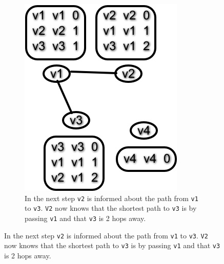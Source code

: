\begin{figure}
\begin{subfigure}{.45\textwidth}
        \includegraphics[width=\textwidth] {images/dv3.png}
        \caption{In the next step \texttt{v2} is informed about the path from \texttt{v1} to \texttt{v3}. \texttt{V2}  now knows that the shortest path to \texttt{v3} is by passing \texttt{v1} and that \texttt{v3} is 2 hops away.}
    \end{subfigure}
\end{figure}
\clearpage
